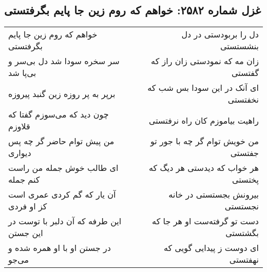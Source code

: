 \begin{center}
\section*{غزل شماره ۲۵۸۲: خواهم که روم زین جا پایم بگرفتستی}
\label{sec:2582}
\begin{longtable}{l p{0.5cm} r}
خواهم که روم زین جا پایم بگرفتستی
&&
دل را بربودستی در دل بنشستستی
\\
سر سخره سودا شد دل بی‌سر و بی‌پا شد
&&
زان مه که نمودستی زان راز که گفتستی
\\
برپر به پر روزه زین گنبد پیروزه
&&
ای آنک در این سودا بس شب که نخفتستی
\\
چون دید که می‌سوزم گفتا که قلاوزم
&&
راهیت بیاموزم کان راه نرفتستی
\\
من پیش توام حاضر گر چه پس دیواری
&&
من خویش توام گر چه با جور تو جفتستی
\\
ای طالب خوش جمله من راست کنم جمله
&&
هر خواب که دیدستی هر دیگ که پختستی
\\
آن یار که گم کردی عمری است کز او فردی
&&
بیرونش بجستستی در خانه نجستستی
\\
این طرفه که آن دلبر با توست در این جستن
&&
دست تو گرفته‌ست او هر جا که بگشتستی
\\
در جستن او با او همره شده و می‌جو
&&
ای دوست ز پیدایی گویی که نهفتستی
\\
\end{longtable}
\end{center}
